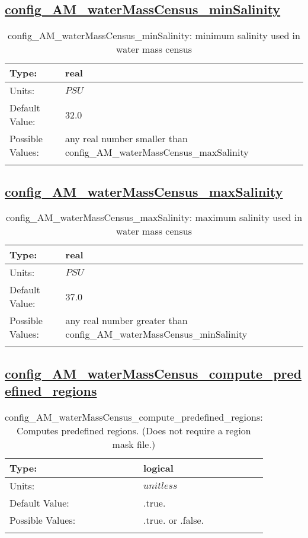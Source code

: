 \subsection[config\_AM\_waterMassCensus\_minSalinity]{\hyperref[sec:nm_tab_AM_waterMassCensus]{config\_AM\_waterMassCensus\_minSalinity}}
\label{subsec:nm_sec_config_AM_waterMassCensus_minSalinity}
\begin{center}
\begin{longtable}{| p{2.0in} || p{4.0in} |}
    \hline
    Type: & real \\
    \hline
    Units: & $PSU$ \\
    \hline
    Default Value: & 32.0 \\
    \hline
    Possible Values: & any real number smaller than config\_AM\_waterMassCensus\_maxSalinity \\
    \hline
    \caption{config\_AM\_waterMassCensus\_minSalinity: minimum salinity used in water mass census}
\end{longtable}
\end{center}
\subsection[config\_AM\_waterMassCensus\_maxSalinity]{\hyperref[sec:nm_tab_AM_waterMassCensus]{config\_AM\_waterMassCensus\_maxSalinity}}
\label{subsec:nm_sec_config_AM_waterMassCensus_maxSalinity}
\begin{center}
\begin{longtable}{| p{2.0in} || p{4.0in} |}
    \hline
    Type: & real \\
    \hline
    Units: & $PSU$ \\
    \hline
    Default Value: & 37.0 \\
    \hline
    Possible Values: & any real number greater than config\_AM\_waterMassCensus\_minSalinity \\
    \hline
    \caption{config\_AM\_waterMassCensus\_maxSalinity: maximum salinity used in water mass census}
\end{longtable}
\end{center}
\subsection[config\_AM\_waterMassCensus\_compute\_predefined\_regions]{\hyperref[sec:nm_tab_AM_waterMassCensus]{config\_AM\_waterMassCensus\_compute\_predefined\_regions}}
\label{subsec:nm_sec_config_AM_waterMassCensus_compute_predefined_regions}
\begin{center}
\begin{longtable}{| p{2.0in} || p{4.0in} |}
    \hline
    Type: & logical \\
    \hline
    Units: & $unitless$ \\
    \hline
    Default Value: & .true. \\
    \hline
    Possible Values: & .true. or .false. \\
    \hline
    \caption{config\_AM\_waterMassCensus\_compute\_predefined\_regions: Computes predefined regions. (Does not require a region mask file.)}
\end{longtable}
\end{center}

